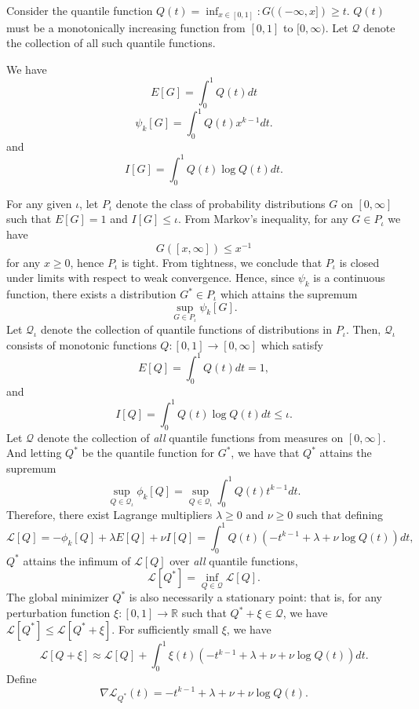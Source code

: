 Consider the quantile function $Q(t) = \inf_{x \in [0,1]}: G((-\infty,
x]) \geq t.$ $Q(t)$ must be a monotonically increasing function from
$[0,1]$ to $[0,\infty).$ Let $\mathcal{Q}$ denote the collection of
all such quantile functions.

We have
\[
E[G] = \int_0^1 Q(t) dt
\]
\[
\psi_k[G] = \int_0^1 Q(t) x^{k-1} dt.
\]
and
\[
I[G] = \int_0^1 Q(t) \log Q(t) dt.
\]

For any given $\iota$, let $P_\iota$ denote the class of probability
distributions $G$ on $[0, \infty]$ such that $E[G]=1$ and
$I[G] \leq \iota.$  From Markov's inequality, for any $G \in P_\iota$
we have
\[
G([x, \infty]) \leq x^{-1}
\]
for any $x \geq 0$, hence $P_\iota$ is tight.  From tightness, we
conclude that $P_\iota$ is closed under limits with respect to weak
convergence.  Hence, since $\psi_k$ is a continuous function, there
exists a distribution $G^* \in P_\iota$ which attains the supremum
\[\sup_{G \in P_\iota} \psi_k[G].\]
Let $\mathcal{Q}_\iota$ denote the collection of quantile functions of
distributions in $P_\iota.$ Then, $\mathcal{Q}_\iota$ consists of monotonic functions
$Q: [0,1] \to [0, \infty]$ which
satisfy
\[
E[Q] = \int_0^1 Q(t) dt = 1,
\]
and
\[
I[Q] = \int_0^1 Q(t) \log Q(t) dt \leq \iota.
\]
Let $\mathcal{Q}$ denote the collection of \emph{all} quantile functions from measures on $[0,\infty]$.
And letting $Q^*$ be the quantile function for $G^*$, we have that
$Q^*$ attains the supremum
\begin{equation}\label{eq:constrained_optim}
\sup_{Q \in \mathcal{Q}_\iota} \phi_k[Q] = \sup_{Q \in \mathcal{Q}_\iota} \int_0^1 Q(t) t^{k-1} dt.
\end{equation}
Therefore, there exist Lagrange multipliers
$\lambda \geq 0$ and $\nu \geq 0$ such that defining
\[
\mathcal{L}[Q] = -\phi_k[Q] + \lambda E[Q] + \nu I[Q]= \int_0^1 Q(t) (-t^{k-1} + \lambda + \nu \log Q(t)) dt,
\]
$Q^*$ attains the infimum of $\mathcal{L}[Q]$ over \emph{all} quantile functions,
\[
\mathcal{L}[Q^*] = \inf_{Q \in \mathcal{Q}}\mathcal{L}[Q].
\]
The global minimizer $Q^*$ is also necessarily a stationary point:
that is, for any perturbation function $\xi: [0,1] \to \mathbb{R}$
such that $Q^* + \xi \in \mathcal{Q}$, we have $\mathcal{L}[Q^*]\leq \mathcal{L}[Q^* + \xi]$.
For sufficiently small $\xi$, we have
\begin{equation}\label{eq:Lperturb}
\mathcal{L}[Q + \xi] \approx \mathcal{L}[Q] + \int_0^1 \xi(t) (-t^{k-1} + \lambda + \nu + \nu \log Q(t)) dt.
\end{equation}
Define
\begin{equation}\label{eq:nablaQ}
\nabla \mathcal{L}_{Q^*}(t) = -t^{k-1} + \lambda + \nu + \nu \log Q(t).
\end{equation}
